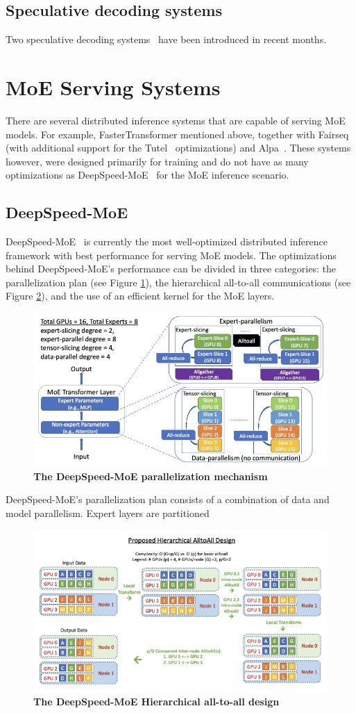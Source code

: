 \subsection{Speculative decoding systems}
Two speculative decoding systems~\cite{speculative-decoding-berkeley, speculative-decoding-google} have been introduced in recent months. 

\section{MoE Serving Systems}\label{chpt2-moe-serving}
There are several distributed inference systems that are capable of serving MoE models. For example, FasterTransformer mentioned above, together with Fairseq~\cite{fairseq} (with additional support for the Tutel~\cite{tutel} optimizations) and Alpa~\cite{alpa}. These systems however, were designed primarily for training and do not have as many optimizations as DeepSpeed-MoE~\cite{deepspeed-moe} for the MoE inference scenario.

\subsection{DeepSpeed-MoE}
DeepSpeed-MoE~\cite{deepspeed-moe} is currently the most well-optimized distributed inference framework with best performance for serving MoE models. The optimizations behind DeepSpeed-MoE's performance can be divided in three categories: the parallelization plan (see Figure \ref{fig:deepspeed-moe-parallelization}), the hierarchical all-to-all communications (see Figure \ref{fig:deepspeed-moe-a2a}), and the use of an efficient kernel for the MoE layers.
\begin{figure}[H]
    \centering
    \includegraphics[width=0.6\linewidth]{figures/deepspeed-moe-parallelization.png}
    \caption{\textbf{The DeepSpeed-MoE parallelization mechanism~\cite{deepspeed-moe}}}
    \label{fig:deepspeed-moe-parallelization}
\end{figure}
DeepSpeed-MoE's parallelization plan consists of a combination of data and model parallelism. Expert layers are partitioned 
\begin{figure}[H]
    \centering
    \includegraphics[width=0.6\linewidth]{figures/deepspeed-moe-a2a.png}
    \caption{\textbf{The DeepSpeed-MoE Hierarchical all-to-all design~\cite{deepspeed-moe}}}
    \label{fig:deepspeed-moe-a2a}
\end{figure}
